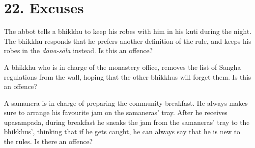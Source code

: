 \chapter{22. Excuses}
\renewcommand*{\theChapterTitle}{22. Excuses}

The abbot tells a bhikkhu to keep his robes with him in his kuti during the
night. The bhikkhu responds that he prefers another definition of the rule, and
keeps his robes in the \emph{dāna-sāla} instead. Is this an offence?

\bigskip

A bhikkhu who is in charge of the monastery office, removes the list of Sangha
regulations from the wall, hoping that the other bhikkhus will forget them. Is
this an offence?

\bigskip

A samanera is in charge of preparing the community breakfast. He always makes
sure to arrange his favourite jam on the samaneras' tray. After he receives
upasampada, during breakfast he sneaks the jam from the samaneras' tray to the
bhikkhus', thinking that if he gets caught, he can always say that he is new to
the rules. Is there an offence?

